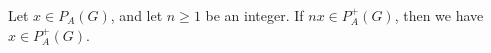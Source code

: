 Let $x \in P_A(G)$, and let $n \geqslant 1$ be an integer. If $nx \in P_A^+(G)$, then we have $x \in P_A^+(G)$.
